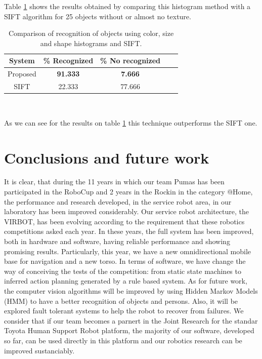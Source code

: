\documentclass{llncs}
\begin{document}
Table \ref{tab:comp} shows the results obtained by comparing this histogram method with a SIFT algorithm for 25 objects
without or almost no texture.


\begin{table}
\centering
\begin{tabular}{|c||c|c|c|c|}
 \hline
System & \% Recognized & \% No recognized  \\
 \hline
Proposed & \textbf{91.333} & \textbf{7.666} \\
SIFT & 22.333 & 77.666 \\
\hline
\end{tabular}
\\
\caption{Comparison of recognition of objects using color, size and shape histograms and SIFT.}
\label{tab:comp}
\end{table}

As we can see for the results on table \ref{tab:comp} this technique outperforms the SIFT one.




\section{Conclusions and future work}\label{sec:conclusions}
It is clear, that during the 11 years in which our team Pumas has been participated in the RoboCup and 2 years
in the Rockin \cite{Rockin} in the category @Home, the performance and research developed, in the service robot area, in our 
laboratory has been improved considerably.
Our service robot architecture, the VIRBOT, has been evolving according to the requirement that these robotics
competitions asked each year.
In these years, the full system has been improved, both in hardware and software, having reliable performance and showing promising 
results. Particularly, this year, we have a new omnidirectional mobile base for navigation and a new torso. 
In terms of software, we have change the way of conceiving the tests of the competition: from static state machines to inferred
action planning generated by a rule based system. 
As for future work, the computer vision algorithms will be improved by using Hidden Markov Models (HMM) to have a better 
recognition of objects and persons. Also, it will be explored fault tolerant systems to help the robot to recover from failures.
We consider that if our team becomes a parnert in the Joint Research for the standar Toyota Human Support Robot 
platform, the majority of our software, developed so far, can be used directly in this platform and our robotics 
research can be improved sustanciably.
\end{document}
